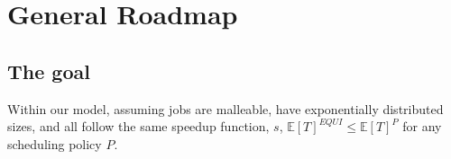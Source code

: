 \chapter{General Roadmap}\label{ch_roadmap}

\section{The goal}

\begin{theorem}\label{EQUI_optimal}
    Within our model, assuming jobs are malleable, have exponentially distributed sizes,
and all follow the same speedup function, $s$, $\mathbb{E}[T]^{EQUI} \leq \mathbb{E}[T]^P$ for any scheduling policy $P$.
\end{theorem}

